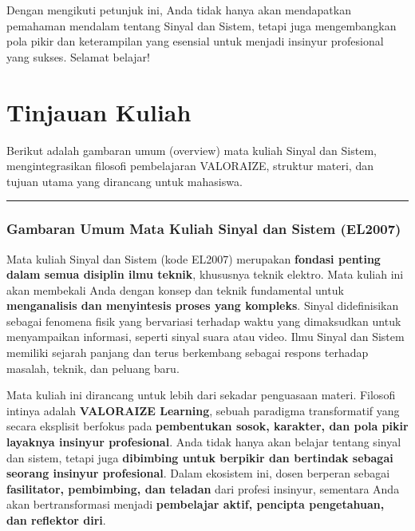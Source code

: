 \documentclass[
  letterpaper,
  DIV=11,
  numbers=noendperiod]{scrreprt}
\begin{document}
Dengan mengikuti petunjuk ini, Anda tidak hanya akan mendapatkan
pemahaman mendalam tentang Sinyal dan Sistem, tetapi juga mengembangkan
pola pikir dan keterampilan yang esensial untuk menjadi insinyur
profesional yang sukses. Selamat belajar!


\chapter{Tinjauan Kuliah}\label{tinjauan-kuliah}

Berikut adalah gambaran umum (overview) mata kuliah Sinyal dan Sistem,
mengintegrasikan filosofi pembelajaran VALORAIZE, struktur materi, dan
tujuan utama yang dirancang untuk mahasiswa.

\begin{center}\rule{0.5\linewidth}{0.5pt}\end{center}

\subsection{\texorpdfstring{\textbf{Gambaran Umum Mata Kuliah Sinyal dan
Sistem
(EL2007)}}{Gambaran Umum Mata Kuliah Sinyal dan Sistem (EL2007)}}\label{gambaran-umum-mata-kuliah-sinyal-dan-sistem-el2007}

Mata kuliah Sinyal dan Sistem (kode EL2007) merupakan \textbf{fondasi
penting dalam semua disiplin ilmu teknik}, khususnya teknik elektro.
Mata kuliah ini akan membekali Anda dengan konsep dan teknik fundamental
untuk \textbf{menganalisis dan menyintesis proses yang kompleks}. Sinyal
didefinisikan sebagai fenomena fisik yang bervariasi terhadap waktu yang
dimaksudkan untuk menyampaikan informasi, seperti sinyal suara atau
video. Ilmu Sinyal dan Sistem memiliki sejarah panjang dan terus
berkembang sebagai respons terhadap masalah, teknik, dan peluang baru.

Mata kuliah ini dirancang untuk lebih dari sekadar penguasaan materi.
Filosofi intinya adalah \textbf{VALORAIZE Learning}, sebuah paradigma
transformatif yang secara eksplisit berfokus pada \textbf{pembentukan
sosok, karakter, dan pola pikir layaknya insinyur profesional}. Anda
tidak hanya akan belajar tentang sinyal dan sistem, tetapi juga
\textbf{dibimbing untuk berpikir dan bertindak sebagai seorang insinyur
profesional}. Dalam ekosistem ini, dosen berperan sebagai
\textbf{fasilitator, pembimbing, dan teladan} dari profesi insinyur,
sementara Anda akan bertransformasi menjadi \textbf{pembelajar aktif,
pencipta pengetahuan, dan reflektor diri}.
\end{document}
